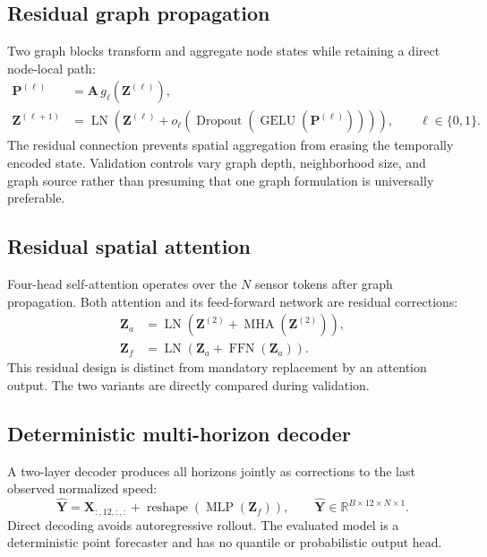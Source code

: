 \documentclass[fleqn,10pt]{wlscirep}
\newenvironment{changedcontent}{\color{changeblue}}{}
\begin{document}
\begin{changedcontent}
\subsection{Residual graph propagation}
Two graph blocks transform and aggregate node states while retaining a direct
node-local path:
\begin{align}
\mathbf{P}^{(\ell)}&=\mathbf{A}\,
g_{\ell}\!\left(\mathbf{Z}^{(\ell)}\right),\\
\mathbf{Z}^{(\ell+1)}&=\operatorname{LN}\!\left(
\mathbf{Z}^{(\ell)}+
o_{\ell}\!\left(\operatorname{Dropout}
(\operatorname{GELU}(\mathbf{P}^{(\ell)}))\right)\right),
\qquad \ell\in\{0,1\}.
\label{eq:graph_blocks}
\end{align}
The residual connection prevents spatial aggregation from erasing the
temporally encoded state. Validation controls vary graph depth, neighborhood
size, and graph source rather than presuming that one graph formulation is
universally preferable.

\subsection{Residual spatial attention}
Four-head self-attention operates over the $N$ sensor tokens after graph
propagation. Both attention and its feed-forward network are residual
corrections:
\begin{align}
\mathbf{Z}_{a}&=\operatorname{LN}\!\left(
\mathbf{Z}^{(2)}+\operatorname{MHA}(\mathbf{Z}^{(2)})\right),\\
\mathbf{Z}_{f}&=\operatorname{LN}\!\left(
\mathbf{Z}_{a}+\operatorname{FFN}(\mathbf{Z}_{a})\right).
\label{eq:residual_attention}
\end{align}
This residual design is distinct from mandatory replacement by an attention
output. The two variants are directly compared during validation.

\subsection{Deterministic multi-horizon decoder}
A two-layer decoder produces all horizons jointly as corrections to the last
observed normalized speed:
\begin{equation}
\widehat{\mathbf{Y}}=
\mathbf{X}_{:,12,:,:}+\operatorname{reshape}
\!\left(\operatorname{MLP}(\mathbf{Z}_{f})\right),
\qquad
\widehat{\mathbf{Y}}\in\mathbb{R}^{B\times12\times N\times1}.
\label{eq:residual_decoder}
\end{equation}
Direct decoding avoids autoregressive rollout. The evaluated model is a
deterministic point forecaster and has no quantile or probabilistic output
head.


\end{changedcontent}
\end{document}

